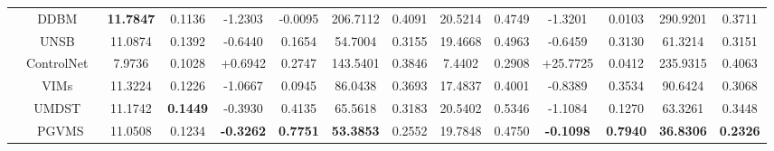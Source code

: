 \documentclass[journal,twoside,web]{ieeecolor}
\begin{document}
\begin{table}[ht]
{\begin{tabular}{c|c|cc|cc|cc|cc|cc|cc}
        &DDBM~\cite{zhou2023denoising} & \textbf{11.7847} & 0.1136 & -1.2303 & -0.0095 & 206.7112 & 0.4091 & 20.5214 & 0.4749 & -1.3201 & 0.0103 & 290.9201 & 0.3711 \\
      &UNSB~\cite{kim2023unpaired} & 11.0874 & 0.1392 & -0.6440 & 0.1654 & 54.7004 & 0.3155 & 19.4668 & 0.4963 & -0.6459 & 0.3130 & 61.3214 & 0.3151 \\
       \Xhline{0.8pt}
      \rowcolor{gray!10}
     & ControlNet~\cite{zhang2023adding}  & 7.9736 & 0.1028 & +0.6942 & 0.2747 & 143.5401 & 0.3846 & 7.4402 & 0.2908 & +25.7725 & 0.0412 & 235.9315 & 0.4063 \\
      \rowcolor{gray!10}
     & VIMs~\cite{dubey2024vims} & 11.3224 & 0.1226 & -1.0667 & 0.0945 & 86.0438 & 0.3693 & 17.4837 & 0.4001 & -0.8389 & 0.3534 & 90.6424 & 0.3068 \\
      \rowcolor{gray!10}
      &  UMDST~\cite{lin2022unpaired} & 
   11.1742 & \textbf{0.1449} & -0.3930 & 0.4135 & 65.5618 & 0.3183 &
   20.5402 & 0.5346 & -1.1084 & 0.1270 & 63.3261 & 0.3448 \\



     
     \rowcolor{gray!10}
    \multirow{-4}{*}{One-to-many}&  PGVMS & 11.0508 & 0.1234 & \textbf{-0.3262} & \textbf{0.7751} & \textbf{53.3853} & 0.2552 & 19.7848 & 0.4750 & \textbf{-0.1098} & \textbf{0.7940} & \textbf{36.8306} & \textbf{0.2326} \\
      \hline
      

\end{tabular}}
\end{table}
\end{document}
